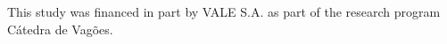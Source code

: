 \documentclass[
	oldfontcommands,
	sumario=abnt-6027-2012,
	12pt,			%
	openright,		%
	oneside,		%
	a4paper,		%
	english,		%
	brazil			%
	]{imecc-unicamp}
\begin{document}
\begin{agradecimentos}
This study was financed in part by VALE S.A. as part of the research program Cátedra de Vagões.
\end{agradecimentos}
\end{document}
